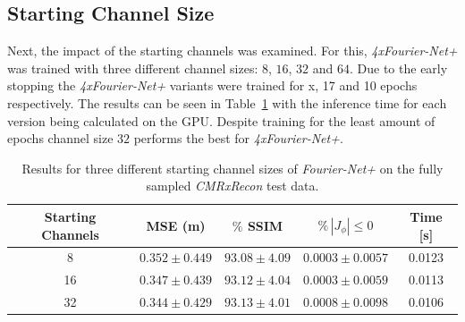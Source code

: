 \documentclass[english,version-2022-01]{uzl-thesis} %
\begin{document}
\subsection{Starting Channel Size} \label{SubSec:ResultsStartingChannelsCMRxRecon}
Next, the impact of the starting channels was examined. For this, \emph{4xFourier-Net+} was trained with three different channel sizes: $8$, $16$, $32$ and $64$. 
Due to the early stopping the \emph{4xFourier-Net+} variants were trained for x, 17 and 10 epochs respectively. The results can be seen in Table~\ref{tab:StartingChannelsFourierNet+CMRxRecon} with the inference time for each version being calculated on the GPU.
Despite training for the least amount of epochs channel size $32$ performs the best for \emph{4xFourier-Net+}.

\begin{table}[htpb]
	\centering
	\caption{Results for three different starting channel sizes of  \emph{Fourier-Net+} on the fully sampled \emph{CMRxRecon} test data.}
	\label{tab:StartingChannelsFourierNet+CMRxRecon}
	\begin{tabular}{c c c c c} %
		\toprule
		Starting Channels & MSE (m) & $\%$ SSIM & $\% \, |J_{\phi}|\leq0$ & Time [s]\\
		\midrule
		8 & $0.352 \pm 0.449$ & $93.08 \pm 4.09$ & $0.0003 \pm 0.0057$ & 0.0123\\ 
		16 & $0.347 \pm 0.439$ & $93.12 \pm 4.04$ & $0.0003 \pm 0.0059$ & 0.0113\\  
		32 & $0.344 \pm 0.429$ & $93.13 \pm 4.01$ & $0.0008 \pm 0.0098$ & 0.0106\\  
		\bottomrule
	\end{tabular}
\end{table}
\end{document}
